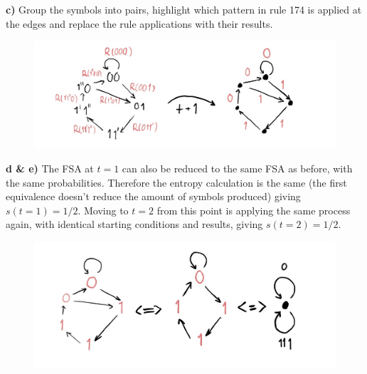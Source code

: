 \documentclass[a4paper, 12pt]{article}
\begin{document}
\textbf{c)}  Group the symbols into pairs, highlight which pattern in rule 174 is applied at the  edges and replace the rule applications with their results.
\begin{figure}[ht!]
    \centering
    \includegraphics[width=0.5 \linewidth]{Info Theory-12.png}
\end{figure}

\textbf{d \& e)}
The FSA at $t = 1$ can also be reduced to the same FSA as before, with the same probabilities. Therefore the entropy calculation is the same (the first equivalence doesn't reduce the amount of symbols produced) giving $s(t=1) = 1/2$. Moving to $t=2$ from this point is applying the same process again, with identical starting conditions and results, giving $s(t=2) = 1/2$.
\begin{figure}[ht!]
    \centering
    \includegraphics[width=0.5 \linewidth]{d.png}
\end{figure}
\end{document}

